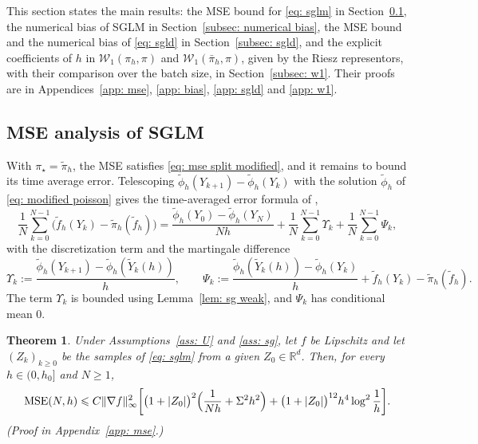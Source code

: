 \documentclass{article}
\newtheorem{theorem}{Theorem}
\newcommand{\Le}{\leqslant}
\newcommand{\Ge}{\geqslant}
\newcommand{\MSE}{\mathrm{MSE}}
\newcommand{\norm}[1]{\lVert #1 \rVert}
\numberwithin{equation}{section}
\begin{document}
This section states the main results: the MSE bound for \eqref{eq: sglm} in Section~\ref{subsec: mse analysis}, the numerical bias of SGLM in Section~\ref{subsec: numerical bias}, the MSE bound and the numerical bias of \eqref{eq: sgld} in Section~\ref{subsec: sgld}, and the explicit coefficients of $h$ in $\mathcal W_1(\pi_h, \pi)$ and $\mathcal W_1(\bar\pi_h, \pi)$, given by the Riesz representors, with their comparison over the batch size, in Section~\ref{subsec: w1}. Their proofs are in Appendices~\ref{app: mse}, \ref{app: bias}, \ref{app: sgld} and \ref{app: w1}.

\subsection{MSE analysis of SGLM}
\label{subsec: mse analysis}

With $\pi_\star = \tilde\pi_h$, the MSE satisfies \eqref{eq: mse split modified}, and it remains to bound its time average error. Telescoping $\tilde\phi_h(Y_{k+1}) - \tilde\phi_h(Y_k)$ with the solution $\tilde\phi_h$ of \eqref{eq: modified poisson} gives the time-averaged error formula of \citep{lu2025mse, ye2026mse},
\begin{equation}
    \frac1N \sum_{k=0}^{N-1} \bigl( \tilde f_h(Y_k) - \tilde\pi_h(\tilde f_h) \bigr)
    = \frac{\tilde\phi_h(Y_0) - \tilde\phi_h(Y_N)}{Nh} + \frac1N \sum_{k=0}^{N-1} \Upsilon_k + \frac1N \sum_{k=0}^{N-1} \Psi_k ,
    \label{eq: time average formula}
\end{equation}
with the discretization term and the martingale difference
\begin{equation}
    \Upsilon_k := \frac{\tilde\phi_h(Y_{k+1}) - \tilde\phi_h(\tilde Y_k(h))}{h} , \qquad
    \Psi_k := \frac{\tilde\phi_h(\tilde Y_k(h)) - \tilde\phi_h(Y_k)}{h} + \tilde f_h(Y_k) - \tilde\pi_h(\tilde f_h) .
    \label{eq: Upsilon Psi}
\end{equation}
The term $\Upsilon_k$ is bounded using Lemma~\ref{lem: sg weak}, and $\Psi_k$ has conditional mean $0$.

\begin{theorem}
\label{thm: sglm mse}
    Under Assumptions~\ref{ass: U} and \ref{ass: sg}, let $f$ be Lipschitz and let $(Z_k)_{k \Ge 0}$ be the samples of \eqref{eq: sglm} from a given $Z_0 \in \mathbb R^d$. Then, for every $h \in (0,h_0]$ and $N \Ge 1$,
    \begin{equation}
        \MSE(N,h) \Le C \norm{\nabla f}_\infty^2 \biggl[ \bigl( 1 + |Z_0| \bigr)^2 \Bigl( \frac{1}{Nh} + \Sigma^2 h^2 \Bigr) + \bigl( 1 + |Z_0| \bigr)^{12} h^4 \log^2\frac1h \biggr] .
        \label{eq: sglm mse}
    \end{equation}
    \emph{(Proof in Appendix~\ref{app: mse}.)}
\end{theorem}
\end{document}
